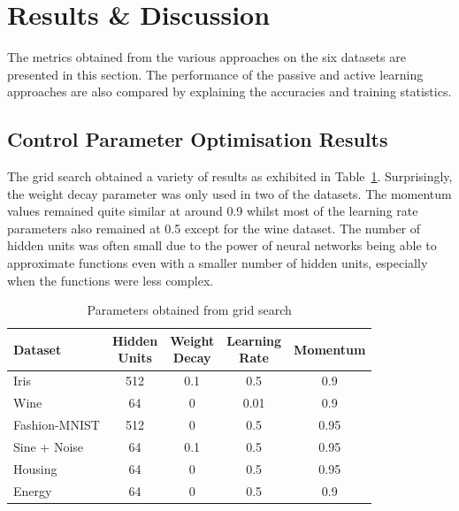 \documentclass[10pt, conference]{IEEEtran}
\begin{document}
\section{Results \& Discussion}
The metrics obtained from the various approaches on the six datasets are presented in this section. The performance of the passive and active learning approaches are also compared by explaining the accuracies and training statistics. 


\subsection{Control Parameter Optimisation Results}
The grid search obtained a variety of results as exhibited in Table~\ref{tab:datasets}. Surprisingly, the weight decay parameter was only used in two of the datasets. The momentum values remained quite similar at around 0.9 whilst most of the learning rate parameters also remained at 0.5 except for the wine dataset. The number of hidden units was often small due to the power of neural networks being able to approximate functions even with a smaller number of hidden units, especially when the functions were less complex.

\begin{table}[htbp]
	\centering
	\caption{Parameters obtained from grid search}
	\begin{tabular}{|l|c|c|c|c|}
		\hline
		\textbf{Dataset} & \makecell{\textbf{Hidden} \\ \textbf{Units}} & \makecell{\textbf{Weight} \\ \textbf{Decay}} & \makecell{\textbf{Learning} \\ \textbf{Rate}} & \textbf{Momentum} \\
		\hline
		Iris & 512 & 0.1 & 0.5 & 0.9 \\
		Wine & 64 & 0 & 0.01 & 0.9 \\
		Fashion-MNIST & 512 & 0 & 0.5 & 0.95 \\
		\hline
		Sine + Noise & 64 & 0.1 & 0.5 & 0.95 \\
		Housing & 64 & 0 & 0.5 & 0.95 \\
		Energy & 64 & 0 & 0.5 & 0.9 \\
		\hline
	\end{tabular}
	\label{tab:datasets}
\end{table}
\end{document}
